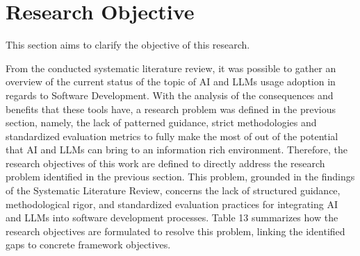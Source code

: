 \section{Research Objective}

This section aims to clarify the objective of this research.

From the conducted systematic literature review, it was possible to gather an overview of the current status of the topic of AI and LLMs usage adoption in regards to Software Development. With the analysis of the consequences and benefits that these tools have, a research problem was defined in the previous section, namely, the lack of patterned guidance, strict methodologies and standardized evaluation metrics to fully make the most of out of the potential that AI and LLMs can bring to an information rich environment. Therefore, the research objectives of this work are defined to directly address the research problem identified in the previous section. This problem, grounded in the findings of the Systematic Literature Review, concerns the lack of structured guidance, methodological rigor, and standardized evaluation practices for integrating AI and LLMs into software development processes. Table 13 summarizes how the research objectives are formulated to resolve this problem, linking the identified gaps to concrete framework objectives.

